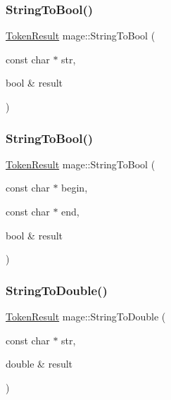 \hypertarget{namespacemage_a4936774f925ba96c5b8d37c5e54cca02}{}\label{namespacemage_a4936774f925ba96c5b8d37c5e54cca02} 
\subsubsection{\texorpdfstring{String\+To\+Bool()}{StringToBool()}\hspace{0.1cm}{\footnotesize\ttfamily [1/2]}}
{\footnotesize\ttfamily \hyperlink{namespacemage_a2178ba2411db5912f41b2e7698c2037d}{Token\+Result} mage\+::\+String\+To\+Bool (\begin{DoxyParamCaption}\item[{const char $\ast$}]{str,  }\item[{bool \&}]{result }\end{DoxyParamCaption})}

\hypertarget{namespacemage_a5deef7799d080b8c98c9ead54fbcb6db}{}\label{namespacemage_a5deef7799d080b8c98c9ead54fbcb6db} 
\subsubsection{\texorpdfstring{String\+To\+Bool()}{StringToBool()}\hspace{0.1cm}{\footnotesize\ttfamily [2/2]}}
{\footnotesize\ttfamily \hyperlink{namespacemage_a2178ba2411db5912f41b2e7698c2037d}{Token\+Result} mage\+::\+String\+To\+Bool (\begin{DoxyParamCaption}\item[{const char $\ast$}]{begin,  }\item[{const char $\ast$}]{end,  }\item[{bool \&}]{result }\end{DoxyParamCaption})}

\hypertarget{namespacemage_a49403be4dcbd136ffb13f62669576c50}{}\label{namespacemage_a49403be4dcbd136ffb13f62669576c50} 
\subsubsection{\texorpdfstring{String\+To\+Double()}{StringToDouble()}\hspace{0.1cm}{\footnotesize\ttfamily [1/2]}}
{\footnotesize\ttfamily \hyperlink{namespacemage_a2178ba2411db5912f41b2e7698c2037d}{Token\+Result} mage\+::\+String\+To\+Double (\begin{DoxyParamCaption}\item[{const char $\ast$}]{str,  }\item[{double \&}]{result }\end{DoxyParamCaption})}

